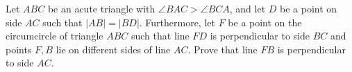 Let $ABC$ be an acute triangle with $\angle BAC>\angle BCA$,  and let $D$ be a point on side $AC$ such that $|AB|=|BD|$. Furthermore, let $F$ be a point on the circumcircle of triangle $ABC$ such that line $FD$ is perpendicular to side $BC$ and points $F,B$ lie on different sides of line $AC$. Prove that line $FB$ is perpendicular to side $AC$.